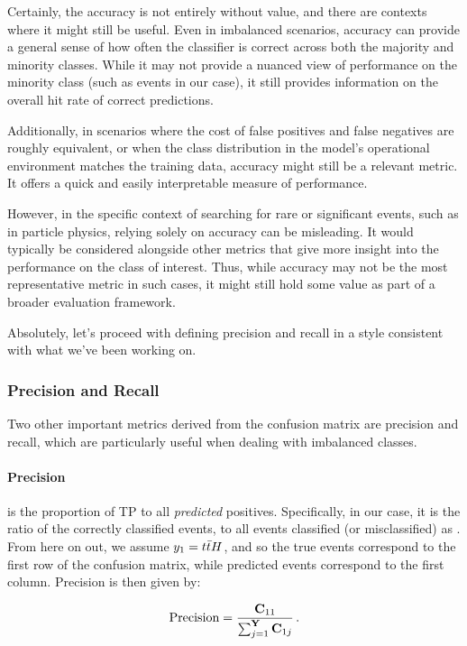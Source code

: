 Certainly, the accuracy is not entirely without value, and there are contexts where it might still be useful. Even in
imbalanced scenarios, accuracy can provide a general sense of how often the classifier is correct across both the
majority and minority classes. While it may not provide a nuanced view of performance on the minority class (such as
\tth events in our case), it still provides information on the overall hit rate of correct predictions.

Additionally, in scenarios where the cost of false positives and false negatives are roughly equivalent, or when the
class distribution in the model's operational environment matches the training data, accuracy might still be a relevant
metric. It offers a quick and easily interpretable measure of performance.

However, in the specific context of searching for rare or significant events, such as \tth in particle physics, relying
solely on accuracy can be misleading. It would typically be considered alongside other metrics that give more insight
into the performance on the class of interest. Thus, while accuracy may not be the most representative metric in such
cases, it might still hold some value as part of a broader evaluation framework.

Absolutely, let's proceed with defining precision and recall in a style consistent with what we've been working on.

\subsubsection{Precision and Recall}

Two other important metrics derived from the confusion matrix are precision and recall, which are particularly useful
when dealing with imbalanced classes.

\paragraph{Precision} is the proportion of TP to all \emph{predicted} positives. Specifically, in our case, it
is the ratio of the correctly classified \tth events, to all events classified (or misclassified) as \tth. From here on
out, we assume $y_1 = {t\bar{t}H}$, and so the true \tth events correspond to the first row of the confusion matrix, while
predicted \tth events correspond to the first column. Precision is then given by:

\begin{align}
    \text{Precision} = \frac{\mathbf{C}_{11}}{\sum_{j=1}^{\textbf{Y}} \mathbf{C}_{1j}}\,.
\end{align}

